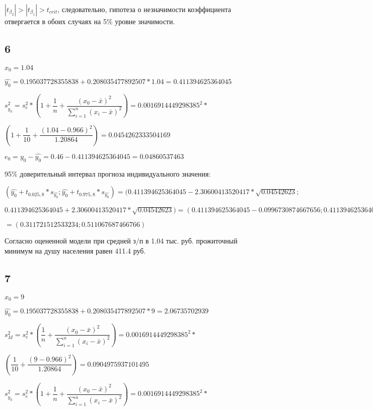 \documentclass[12pt,a4paper, oneside]{extreport}
\begin{document}
$|t_{\beta_2}| > |t_{\beta_1}| > t_{crit} $, следовательно, гипотеза о незначимости коэффициента отвергается в обоих случаях на 5\% уровне значимости. 

\subsection*{6}

$x_0=1.04$

$\hat{y_0} = 0.195037728355838 + 0.208035477892507 * 1.04 = 0.411394625364045  $

$s_{\hat{y_0}}^2 = s^2_e * \left(1  + \dfrac{1}{n} + \dfrac{(x_0-\bar{x})^2}{\sum_{i=1}^n (x_i-\bar{x})^2 } \right) = 0.0016914449298385^2 * $

$ \left(1  + \dfrac{1}{10} + \dfrac{(1.04-0.966)^2}{1.20864 } \right)   = 0.0454262333504169$

$e_0 = y_0 - \hat{y_0} = 0.46 - 0.411394625364045  = 0.04860537463 $

95\% доверительный интервал прогноза индивидуального значения:

$(\hat{y_0} + t_{0.025, 8} * s_{\hat{y_0}}; \hat{y_0} + t_{0.975, 8} * s_{\hat{y_0}}) = (0.411394625364045 -  2.30600413520417 * \sqrt{0.04542623} ; $

$ 0.411394625364045 +  2.30600413520417 * \sqrt{0.04542623} ) = (0.411394625364045 -  0.0996730874667656 ;  0.411394625364045 +  0.0996730874667656  ) =$

$= (0.311721512533234; 0.511067687466766) $

Согласно оцененной модели 
при средней з/п в 1.04 тыс. руб. прожиточный минимум на душу населения равен 411.4 руб.


\subsection*{7}


$x_0=9$

$\hat{y_0} = 0.195037728355838 + 0.208035477892507 * 9 = 2.06735702939 $

$s_{M}^2 = s^2_e * \left( \dfrac{1}{n} + \dfrac{(x_0-\bar{x})^2}{\sum_{i=1}^n (x_i-\bar{x})^2 } \right) = 0.0016914449298385^2 *$

$ \left( \dfrac{1}{10} + \dfrac{(9-0.966)^2}{1.20864 } \right)   = 0.0904975937101495$

$s_{\hat{y_0}}^2 = s^2_e * \left(1  + \dfrac{1}{n} + \dfrac{(x_0-\bar{x})^2}{\sum_{i=1}^n (x_i-\bar{x})^2 } \right) = 0.0016914449298385^2 *$
\end{document}
